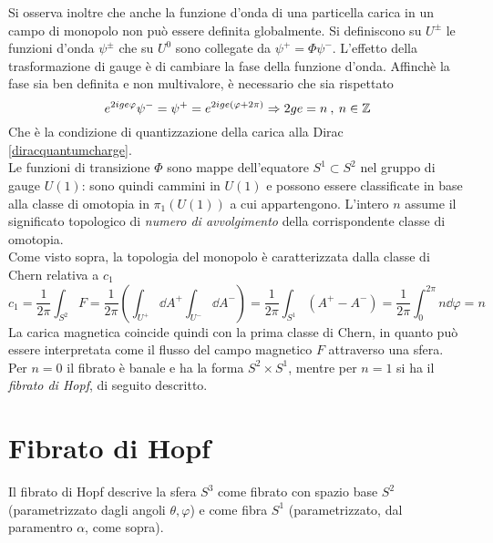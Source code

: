 Si osserva inoltre che anche la funzione d'onda di una particella carica in un
campo di monopolo non può essere definita globalmente.
Si definiscono su $U^\pm$ le funzioni d'onda $\psi^\pm$ che su $U^0$ sono collegate
da $\psi^+ = \Phi  \psi^-$. L'effetto della trasformazione di gauge è di cambiare la fase
della funzione d'onda. Affinchè la fase sia ben definita e non multivalore, è necessario
che sia rispettato
$$
   e^{2ige \varphi} \psi ^- = \psi ^+ =  e^{2ige (\varphi + 2\pi)} \Rightarrow
    2ge = n \:,\: n \in \mathbb{Z}
$$
Che è la condizione di quantizzazione della carica alla Dirac \ref{diracquantumcharge}.\\

Le funzioni di transizione $\Phi$ sono mappe dell'equatore $S^1 \subset S^2$ nel gruppo
di gauge $U(1)$: sono quindi cammini in $U(1)$ e possono essere
classificate in base alla classe di omotopia in $\pi_1(U(1))$ a cui appartengono.
L'intero $n$ assume il significato topologico di \emph{numero di avvolgimento}
della corrispondente classe di omotopia.\\

Come visto sopra, la topologia del monopolo è caratterizzata dalla classe di Chern
relativa a $c_1$
\begin{equation*}
      c_1   = \frac{1}{2\pi} \int_{S^2} F
            = \frac{1}{2\pi} \left( \int_{U^+} \dd A^+ \int_{U^-} \dd A^- \right)
            = \frac{1}{2\pi} \int_{S^1} (A^+-A^-)
            = \frac{1}{2\pi} \int_0^{2\pi} n\dd \varphi   = n
\end{equation*}
La carica magnetica coincide quindi con la prima classe di Chern, in quanto
può essere interpretata come il flusso del campo magnetico $F$ attraverso una sfera.\\
Per $n=0$ il fibrato è banale e ha la forma $S^2 \times S^1$, mentre per $n=1$ si ha il
\emph{fibrato di Hopf}, di seguito descritto.

\section{Fibrato di Hopf}
Il fibrato di Hopf descrive la sfera $S^3$ come fibrato con spazio
base $S^2$ (parametrizzato dagli angoli $\theta,\varphi $) e come fibra $S^1$ (parametrizzato,
dal paramentro $\alpha$, come sopra).\\

